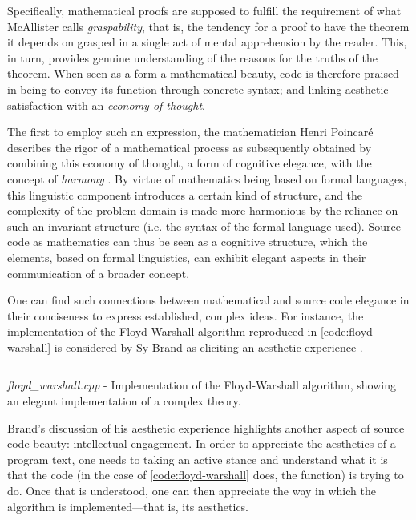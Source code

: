 Specifically, mathematical proofs are supposed to fulfill the requirement of what McAllister calls \emph{graspability}, that is, the tendency for a proof to have the theorem it depends on grasped in a single act of mental apprehension by the reader. This, in turn, provides genuine understanding of the reasons for the truths of the theorem. When seen as a form a mathematical beauty, code is therefore praised in being to convey its function through concrete syntax; and linking aesthetic satisfaction with an \emph{economy of thought}.

The first to employ such an expression, the mathematician Henri Poincaré describes the rigor of a mathematical process as subsequently obtained by combining this economy of thought, a form of cognitive elegance, with the concept of \emph{harmony} \citep{poincare_science_1908}. By virtue of mathematics being based on formal languages, this linguistic component introduces a certain kind of structure, and the complexity of the problem domain is made more harmonious by the reliance on such an invariant structure (i.e. the syntax of the formal language used). Source code as mathematics can thus be seen as a cognitive structure, which the elements, based on formal linguistics, can exhibit elegant aspects in their communication of a broader concept.

One can find such connections between mathematical and source code elegance in their conciseness to express established, complex ideas. For instance, the implementation of the Floyd-Warshall algorithm reproduced in \autoref{code:floyd-warshall} is considered by Sy Brand as eliciting an aesthetic experience \citep{cpppconference_keynote_2022}.

\begin{listing}
  \inputminted{perl}{./corpus/floyd_warshall.cpp}
  \caption{\emph{floyd\_warshall.cpp} - Implementation of the Floyd-Warshall algorithm, showing an elegant implementation of a complex theory.}
  \label{code:floyd-warshall}
\end{listing}

Brand's discussion of his aesthetic experience highlights another aspect of source code beauty: intellectual engagement. In order to appreciate the aesthetics of a program text, one needs to taking an active stance and understand what it is that the code (in the case of \autoref{code:floyd-warshall} does, the function) is trying to do. Once that is understood, one can then appreciate the way in which the algorithm is implemented—that is, its aesthetics.

